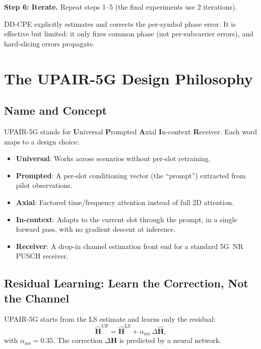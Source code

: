 \documentclass[11pt,a4paper]{article}
\newcommand{\bH}{\mathbf{H}}
\begin{document}
	\textbf{Step 6: Iterate.}  Repeat steps 1--5 (the final experiments use 2 iterations).
	
	\begin{keyidea}
		DD-CPE explicitly estimates and corrects the per-symbol phase error.  It is effective but limited: it only fixes common phase (not per-subcarrier errors), and hard-slicing errors propagate.
	\end{keyidea}
	
	\section{The UPAIR-5G Design Philosophy}
	
	\subsection{Name and Concept}
	
	UPAIR-5G stands for \textbf{U}niversal \textbf{P}rompted \textbf{A}xial \textbf{I}n-context \textbf{R}eceiver.  Each word maps to a design choice:
	\begin{itemize}[nosep]
		\item \textbf{Universal}: Works across scenarios without per-slot retraining.
		\item \textbf{Prompted}: A per-slot conditioning vector (the ``prompt'') extracted from pilot observations.
		\item \textbf{Axial}: Factored time/frequency attention instead of full 2D attention.
		\item \textbf{In-context}: Adapts to the current slot through the prompt, in a single forward pass, with no gradient descent at inference.
		\item \textbf{Receiver}: A drop-in channel estimation front end for a standard 5G~NR PUSCH receiver.
	\end{itemize}
	
	\subsection{Residual Learning: Learn the Correction, Not the Channel}
	
	UPAIR-5G starts from the LS estimate and learns only the residual:
	\begin{equation}
		\widehat{\bH}^{\mathrm{UP}} = \widehat{\bH}^{\mathrm{LS}} + \alpha_{\mathrm{res}}\,\Delta\widehat{\bH},
	\end{equation}
	with $\alpha_{\mathrm{res}} = 0.35$.  The correction $\Delta\widehat{\bH}$ is predicted by a neural network.
	
\end{document}
